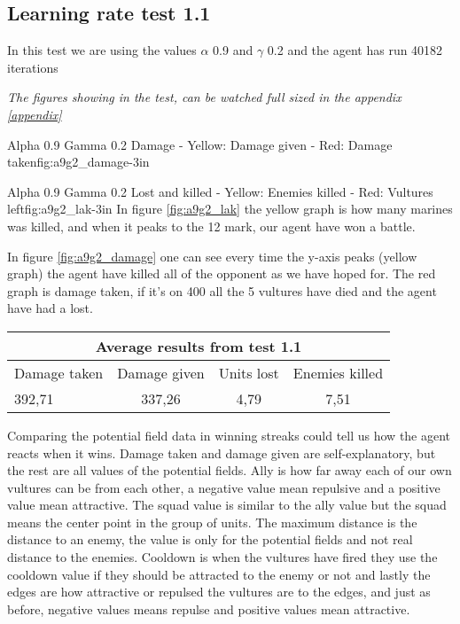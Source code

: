 \subsection*{Learning rate test 1.1}
In this test we are using the values $\alpha$ 0.9 and $\gamma$ 0.2 and the agent has run 40182 iterations


\textit{The figures showing in the test, can be watched full sized in the appendix \ref{appendix}} 

			{Alpha 0.9 Gamma 0.2 Damage - Yellow: Damage given - Red: Damage taken}{fig:a9g2_damage}{-3in}

			{Alpha 0.9 Gamma 0.2 Lost and killed - Yellow: Enemies killed - Red: Vultures left}{fig:a9g2_lak}{-3in}
In figure \ref{fig:a9g2_lak} the yellow graph is how many marines was killed, and when it peaks to the 12 mark, our agent have won a battle.




In figure \ref{fig:a9g2_damage} one can see every time the y-axis peaks (yellow graph) the agent have killed all of the opponent as we have hoped for. The red graph is damage taken, if it's on 400 all the 5 vultures have died and the agent have had a lost.

\begin{centering}
 \begin{tabular}{|l|c|c|c|}
	\multicolumn{4}{c}{Average results from test 1.1} \\
	\hline
		Damage taken & Damage given & Units lost & Enemies killed\\
	\hline
		392,71 & 337,26 & 4,79 & 7,51 \\
	\hline
\end{tabular}
\end{centering}

Comparing the potential field data in winning streaks could tell us how the agent reacts when it wins. Damage taken and damage given are self-explanatory, but the rest are all values of the potential fields. Ally is how far away each of our own vultures can be from each other, a negative value mean repulsive and a positive value mean attractive. The squad value is similar to the ally value but the squad means the center point in the group of units. The maximum distance is the distance to an enemy, the value is only for the potential fields and not real distance to the enemies. Cooldown is when the vultures have fired they use the cooldown value if they should be attracted to the enemy or not and lastly the edges are how attractive or repulsed the vultures are to the edges, and just as before, negative values means repulse and positive values mean attractive. 
\newpage
